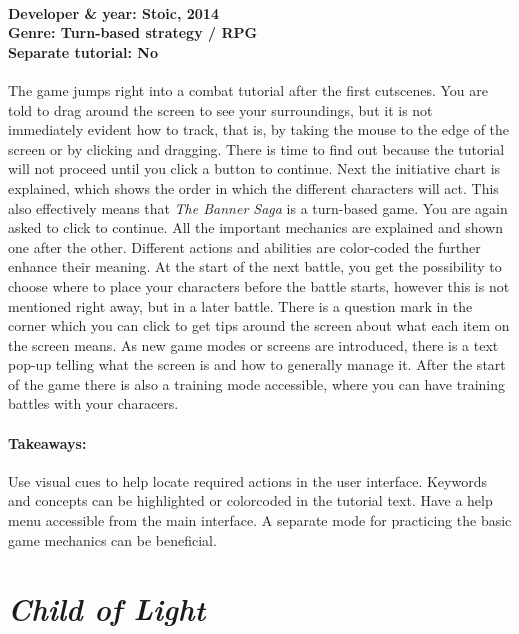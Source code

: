 \paragraph{Developer \& year: Stoic, 2014 \\ Genre: Turn-based strategy / RPG \\ Separate tutorial: No \\}
The game jumps right into a combat tutorial after the first cutscenes. You are told to drag around the screen to see your surroundings, but it is not immediately evident how to track, that is, by taking the mouse to the edge of the screen or by clicking and dragging. There is time to find out because the tutorial will not proceed until you click a button to continue. Next the initiative chart is explained, which shows the order in which the different characters will act. This also effectively means that \textit{The Banner Saga} is a turn-based game. You are again asked to click to continue. All the important mechanics are explained and shown one after the other. Different actions and abilities are color-coded the further enhance their meaning. At the start of the next battle, you get the possibility to choose where to place your characters before the battle starts, however this is not mentioned right away, but in a later battle. There is a question mark in the corner which you can click to get tips around the screen about what each item on the screen means. As new game modes or screens are introduced, there is a text pop-up telling what the screen is and how to generally manage it. After the start of the game there is also a training mode accessible, where you can have training battles with your characers.
\paragraph{Takeaways:}
Use visual cues to help locate required actions in the user interface. Keywords and concepts can be highlighted or colorcoded in the tutorial text. Have a help menu accessible from the main interface. A separate mode for practicing the basic game mechanics can be beneficial.

\section{\textit{Child of Light}}
